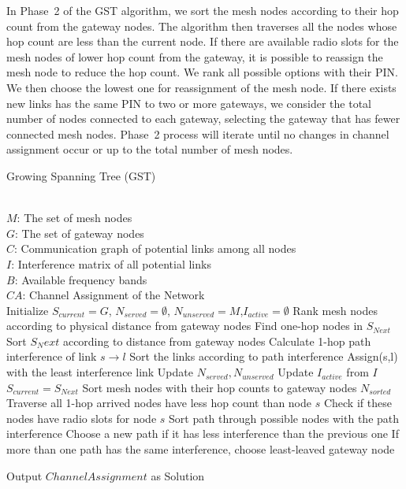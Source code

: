In Phase~2 of the GST algorithm, we sort the mesh nodes according
to their hop count from the gateway nodes.  The algorithm then
traverses all the nodes whose hop count are less than the current node. 
If there are available radio slots for the mesh nodes of lower hop
count from the gateway, it is possible to reassign the mesh node 
to reduce the hop count.  We rank all possible options with their PIN.
We then choose the lowest one for reassignment of the mesh node. If 
there exists new links has the same PIN to two or more gateways, we 
consider the total number of nodes connected to each gateway, selecting
the gateway that has fewer connected mesh nodes. Phase~2 process will 
iterate until no changes in channel assignment occur or up to the total 
number of mesh nodes.


\begin{algorithm}
    \small
\caption{Growing Spanning Tree (GST)}
\label{algorithms:gst}
\begin{algorithmic}[1]
\REQUIRE  ~~\\
	 $M$: The set of mesh nodes\\
	 $G$: The set of gateway nodes\\
	 $C$: Communication graph of potential links among all nodes\\
	 $I$: Interference matrix of all potential links \\
	 $B$: Available frequency bands
\ENSURE ~~\\    
$CA$: Channel Assignment of the Network\\
\STATE Initialize $S_{current}=G$, $N_{served}=\emptyset$, $N_{unserved}=M$,$I_{active}=\emptyset$
\STATE Rank mesh nodes according to physical distance from gateway nodes
	\STATE Find one-hop nodes in $S_{Next}$
	\STATE Sort $S_Next$ according to distance from gateway nodes
		\STATE Calculate 1-hop path interference of link $s\rightarrow l$
		\STATE Sort the links according to path interference
		\STATE Assign(s,l) with the least interference link
		\STATE Update $N_{served},N_{unserved}$
		\STATE Update $I_{active}$ from $I$
	\ENDFOR
	\STATE $S_{current}=S_{Next}$
\ENDFOR
\ENDWHILE
\STATE Sort mesh nodes with their hop counts to gateway nodes $N_{sorted}$
	\STATE Traverse all 1-hop arrived nodes have less hop count than node $s$ 
	\STATE Check if these nodes have radio slots for node $s$
	\STATE Sort path through possible nodes with the path interference
	\STATE Choose a new path if it has less interference than the previous one
	\STATE If more than one path has the same interference, choose least-leaved gateway node
\ENDFOR
\ENDWHILE

Output $Channel Assignment$ as Solution
\end{algorithmic}
\end{algorithm}
      
